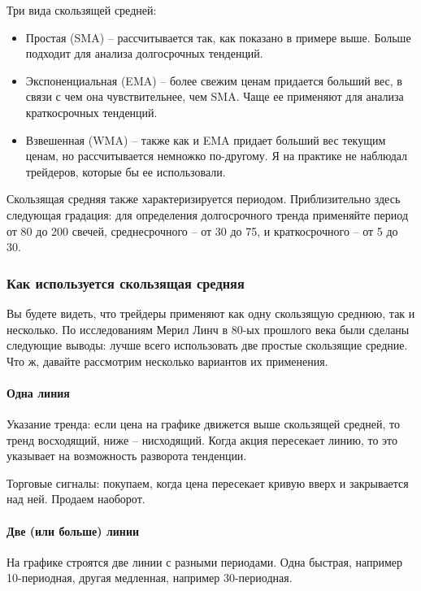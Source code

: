 \documentclass[a5paper]{article}
\begin{document}
Три вида скользящей средней:

\begin{itemize}
\item     Простая (SMA) – рассчитывается так, как показано в примере выше. Больше подходит для анализа долгосрочных тенденций.
\item     Экспоненциальная (EMA) – более свежим ценам придается больший вес, в связи с чем она чувствительнее, чем SMA. Чаще ее применяют для анализа краткосрочных тенденций.
\item     Взвешенная (WMA) – также как и EMA придает больший вес текущим ценам, но рассчитывается немножко по-другому. Я на практике не наблюдал трейдеров, которые бы ее использовали.
\end{itemize}

Скользящая средняя также характеризируется периодом. Приблизительно
здесь следующая градация: для определения долгосрочного тренда
применяйте период от 80 до 200 свечей, среднесрочного – от 30 до 75, и
краткосрочного – от 5 до 30.

\subsubsection{Как используется скользящая средняя}

Вы будете видеть, что трейдеры применяют как одну скользящую среднюю, так и несколько. По исследованиям Мерил Линч в 80-ых прошлого века были сделаны следующие выводы: лучше всего использовать две простые скользящие средние. Что ж, давайте рассмотрим несколько вариантов их применения.

\paragraph{Одна линия}

Указание тренда: если цена на графике движется выше скользящей средней, то тренд восходящий, ниже – нисходящий. Когда акция пересекает линию, то это указывает на возможность разворота тенденции.

Торговые сигналы: покупаем, когда цена пересекает кривую вверх и закрывается над ней. Продаем наоборот.

\paragraph{Две (или больше) линии}

На графике строятся две линии с разными периодами. Одна быстрая, например 10-периодная, другая медленная, например 30-периодная.
\end{document}
